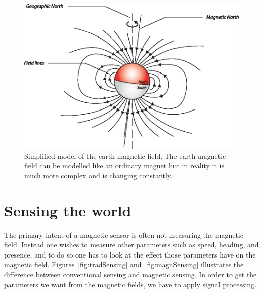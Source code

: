 \begin{figure}[!fbth]
 \centering
  \begin{minipage}{0.6\linewidth}
  \centering
   \includegraphics[width=1\linewidth]{images/earthmagnetic}
  \caption[Simplified model of the earth magnetic field]{Simplified model of the earth magnetic field. The earth magnetic field can be modelled like an ordinary magnet but in reality it is much more complex and is changing constantly.}
  \label{fig-earthmagnetic}
  \end{minipage}\hfill
\end{figure}

\section{Sensing the world}

The primary intent of a magnetic sensor is often not measuring the magnetic field. Instead one wishes to measure other parameters such as speed, heading, and presence, and to do so one has to look at the effect those parameters have on the magnetic field. Figures~\ref{fig:tradSensing} and~\ref{fig:magnSensing} illustrates the difference between conventional sensing and magnetic sensing. In order to get the parameters we want from the magnetic fields, we have to apply signal processing.

